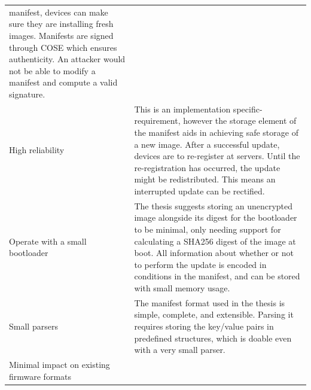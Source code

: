 \documentclass[0-thesis.tex]{subfiles}
\begin{document}
\begin{small}
\begin{longtable}[]{@{}ll@{}}
\begin{minipage}[t]{0.53\columnwidth}
    manifest, devices can make sure they are installing fresh images.
    Manifests are signed through COSE which ensures authenticity. An
    attacker would not be able to modify a manifest and compute a
    valid signature.\strut
    \end{minipage}\tabularnewline
    \begin{minipage}[t]{0.41\columnwidth}\raggedright\strut
    High reliability\strut
    \end{minipage} & \begin{minipage}[t]{0.53\columnwidth}\raggedright\strut
    This is an implementation specific-requirement, however the storage
    element of the manifest aids in achieving safe storage of a new image.
    After a successful update, devices are to re-register at servers. Until 
    the re-registration has occurred, the update might be redistributed. 
    This means an interrupted update can be rectified.\strut
    \end{minipage}\tabularnewline
    \begin{minipage}[t]{0.41\columnwidth}\raggedright\strut
    Operate with a small bootloader\strut
    \end{minipage} & \begin{minipage}[t]{0.53\columnwidth}\raggedright\strut
    The thesis suggests storing an unencrypted image alongside its digest
    for the bootloader to be minimal, only needing support for calculating a
    SHA256 digest of the image at boot. All information about whether or not
    to perform the update is encoded in conditions in the manifest, and can
    be stored with small memory usage.\strut
    \end{minipage}\tabularnewline
    \begin{minipage}[t]{0.41\columnwidth}\raggedright\strut
    Small parsers\strut
    \end{minipage} & \begin{minipage}[t]{0.53\columnwidth}\raggedright\strut
    The manifest format used in the thesis is simple, complete, and
    extensible. Parsing it requires storing the key/value pairs in
    predefined structures, which is doable even with a very small
    parser.\strut
    \end{minipage}\tabularnewline
    \begin{minipage}[t]{0.41\columnwidth}\raggedright\strut
    Minimal impact on existing firmware formats\strut
    \end{minipage} & \begin{minipage}[t]{0.53\columnwidth}\raggedright\strut

\end{minipage}
\end{longtable}
\end{small}
\end{document}

